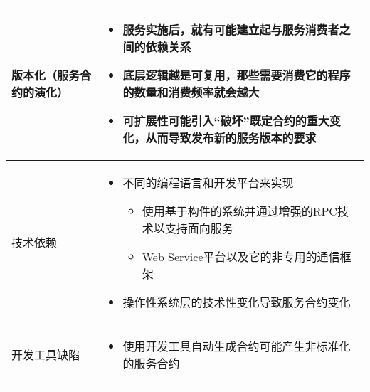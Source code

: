 \begin{longtable}{|m{3cm}<{\centering}|m{12cm}|}
    \hline
    版本化（服务合约的演化）
    & 
    \vspace{-1.3em}
    \begin{itemize}[leftmargin=1.5em,itemsep=-3pt,topsep=-3pt]
        \item 服务实施后，就有可能建立起与服务消费者之间的依赖关系
        \item 底层逻辑越是可复用，那些需要消费它的程序的数量和消费频率就会越大
        \item 可扩展性可能引入“破坏”既定合约的重大变化，从而导致发布新的服务版本的要求 
    \vspace{-1.5em}
    \end{itemize}  
    \\ \hline
    技术依赖
    & 
    \vspace{-1.3em}
    \begin{itemize}[leftmargin=1.5em,itemsep=-3pt,topsep=-3pt]
        \item 不同的编程语言和开发平台来实现
        \begin{itemize}[leftmargin=1.5em,itemsep=-3pt,topsep=-3pt]
            \item 使用基于构件的系统并通过增强的RPC技术以支持面向服务
            \item Web Service平台以及它的非专用的通信框架
        \end{itemize} 
        \item 操作性系统层的技术性变化导致服务合约变化
    \vspace{-1.5em}
    \end{itemize}  
    \\ \hline
    开发工具缺陷
    & 
    \vspace{-1.3em}
    \begin{itemize}[leftmargin=1.5em,itemsep=-3pt,topsep=-3pt]
        \item 使用开发工具自动生成合约可能产生非标准化的服务合约
    \vspace{-1.5em}
    \end{itemize}  
    \\ \hline
\end{longtable}